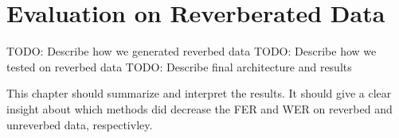 
\chapter{Evaluation on Reverberated Data}
TODO: Describe how we generated reverbed data
TODO: Describe how we tested on reverbed data
TODO: Describe final architecture and results

\label{ch:results}
This chapter should summarize and interpret the results. It should give a clear insight
about which methods did decrease the FER and WER on reverbed and unreverbed data, respectivley.
